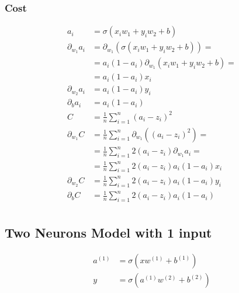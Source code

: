 \documentclass{article}
\begin{document}
\subsubsection{Cost}

\def\pd[#1]{\partial_{#1}}
\def\avgsum[#1,#2]{\frac{1}{#2}\sum_{#1=1}^{#2}}
\begin{align}
  a_i &= \sigma(x_iw_1 + y_iw_2 + b) \\
  \pd[w_1]a_i
      &= \pd[w_1](\sigma(x_iw_1 + y_iw_2 + b)) = \\
      &= a_i(1 - a_i)\pd[w_1](x_iw_1 + y_iw_2 + b) = \\
      &= a_i(1 - a_i)x_i \\
  \pd[w_2]a_i &= a_i(1 - a_i)y_i \\
  \pd[b]a_i &= a_i(1 - a_i) \\
  C &= \avgsum[i, n](a_i - z_i)^2 \\
  \pd[w_1] C
      &= \avgsum[i, n]\pd[w_1]\left((a_i - z_i)^2\right) = \\
      &= \avgsum[i, n]2(a_i - z_i)\pd[w_1]a_i = \\
      &= \avgsum[i, n]2(a_i - z_i)a_i(1 - a_i)x_i \\
  \pd[w_2] C &= \avgsum[i, n]2(a_i - z_i)a_i(1 - a_i)y_i \\
  \pd[b] C &= \avgsum[i, n]2(a_i - z_i)a_i(1 - a_i) \\
\end{align}

\subsection{Two Neurons Model with 1 input}

\begin{center}
\end{center}

\begin{align}
  a^{(1)} &= \sigma(xw^{(1)} + b^{(1)}) \\
  y &= \sigma(a^{(1)}w^{(2)} + b^{(2)})
\end{align}
\end{document}
